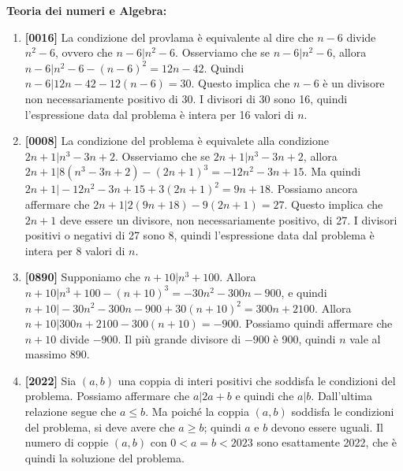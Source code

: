 \documentclass{article}
\begin{document}
\textbf{Teoria dei numeri e Algebra:}
\begin{enumerate}
	\item	\textbf{[0016]} La condizione del provlama è equivalente
		al dire che $n-6$ divide $n^2-6$, ovvero che $n-6\vert n^2-6$.
		Osserviamo che se $n-6\vert n^2-6$, allora $n-6\vert n^2-6
		-(n-6)^2=12n-42$. Quindi $n-6\vert 12n-42-12(n-6)=30$.
		Questo implica che $n-6$ è un divisore non necessariamente
		positivo di $30$. I divisori di 30 sono 16, quindi l'espressione
		data dal problema è intera per 16 valori di $n$.

	\item \textbf{[0008]} La condizione del problema
		è equivalete alla condizione
		$2n+1\vert n^3-3n+2$. Osserviamo che se $2n+1\vert n^3-3n+2$,
		allora $2n+1\vert 8(n^3-3n+2)-(2n+1)^3=-12n^2-3n+15$.
		Ma quindi $2n+1\vert -12n^2-3n+15+3(2n+1)^2=9n+18$. Possiamo ancora
		affermare che $2n+1\vert 2(9n+18)-9(2n+1)=27$. Questo implica che
		$2n+1$ deve essere un divisore, non necessariamente positivo, di 27.
		I divisori positivi o negativi di 27 sono 8, quindi l'espressione
		data dal problema è intera per 8 valori di $n$.
	\item \textbf{[0890]} Supponiamo che $n+10\vert n^3+100$.
		Allora $n+10\vert n^3+100-(n+10)^3=-30n^2-300n-900$, e quindi
		$n+10\vert -30n^2-300n-900+30(n+10)^2=300n+2100$. Allora
		$n+10\vert 300n+2100-300(n+10)=-900$. Possiamo  quindi
		affermare che $n+10$ divide $-900$. Il più grande divisore di $-900$
		è 900, quindi $n$ vale al massimo $890$.
	\item \textbf{[2022]} Sia $(a,b)$ una coppia di interi positivi
		che soddisfa le condizioni del problema.
		Possiamo affermare che $a\vert 2a+b$ e quindi che $a\vert b$.
		Dall'ultima relazione segue che $a\le b$. Ma poiché la coppia
		$(a,b)$ soddisfa le condizioni del problema, si deve avere che
		$a\ge b$; quindi $a$ e $b$ devono essere uguali.
		Il numero di coppie $(a,b)$ con $0<a=b<2023$ sono esattamente
		2022, che è quindi la soluzione del problema.
\end{enumerate}
\end{document}
